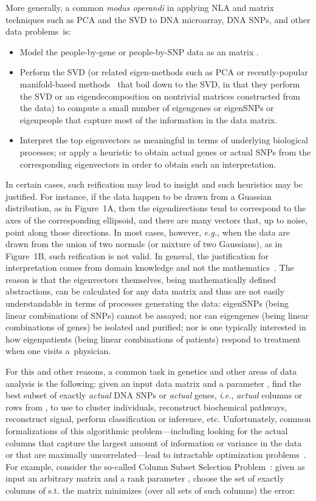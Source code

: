 \documentclass[twoside]{article}
\begin{document}
More generally, a common \emph{modus operandi} in applying NLA and matrix 
techniques such as PCA and the SVD to DNA microarray, DNA SNPs, and other 
data problems~is:
\begin{itemize}
\item
Model the people-by-gene or people-by-SNP data as an  matrix .
\item
Perform the SVD (or related eigen-methods such as PCA or recently-popular 
manifold-based methods~\cite{TSL00,RS00,SWHSL06} that boil down to the SVD, 
in that they perform the SVD or an eigendecomposition on nontrivial matrices 
constructed from the data) 
to compute a small number of eigengenes or eigenSNPs or eigenpeople that 
capture most of the information in the data matrix.
\item 
Interpret the top eigenvectors as meaningful in terms of underlying 
biological processes; or apply a heuristic to obtain actual genes or actual 
SNPs from the corresponding eigenvectors in order to obtain such an 
interpretation.
\end{itemize}
In certain cases, such reification may lead to insight and such heuristics 
may be justified. 
For instance, if the data happen to be drawn from a Guassian distribution, 
as in Figure~1A,
then the eigendirections tend to correspond to the axes of the corresponding
ellipsoid, and there are many vectors that, up to noise, point along those
directions.
In most cases, however, \emph{e.g.}, when the data are drawn from the union 
of two normals (or mixture of two Gaussians), as in Figure~1B, such reification is not valid.
In general, the justification for interpretation comes from domain 
knowledge and not the mathematics~\cite{Gould96,KPS02,MPC78,CUR_PNAS}.
The reason is that the eigenvectors themselves, being mathematically defined
abstractions, can be calculated for any data matrix and thus are not easily 
understandable in terms of processes generating the data:
eigenSNPs (being linear combinations of SNPs) cannot be assayed;
nor can eigengenes (being linear combinations of genes) be isolated and purified;
nor is one typically interested in how eigenpatients (being linear combinations of patients) respond to treatment 
when one visits a~physician.

For this and other reasons, a common task in genetics and other areas of data 
analysis is the following: given an input data matrix  and a parameter 
, find the best subset of exactly  \emph{actual} DNA SNPs or 
\emph{actual} genes, \emph{i.e.}, \emph{actual} columns or rows from , to 
use to cluster individuals, reconstruct biochemical pathways, reconstruct 
signal, perform classification or inference, etc.
Unfortunately, common formalizations of this algorithmic problem---including 
looking for the  actual columns that capture the largest amount of 
information or variance in the data or that are maximally 
uncorrelated---lead to intractable optimization 
problems~\cite{CM08,CM09a}.
For example, consider the so-called Column Subset Selection Problem~\cite{BMD09_CSSP_SODA}:
given as input an arbitrary  matrix  and a rank parameter 
, choose the set of exactly  columns of  s.t. the  
matrix  minimizes (over all  sets of such columns) the error:
\end{document}
